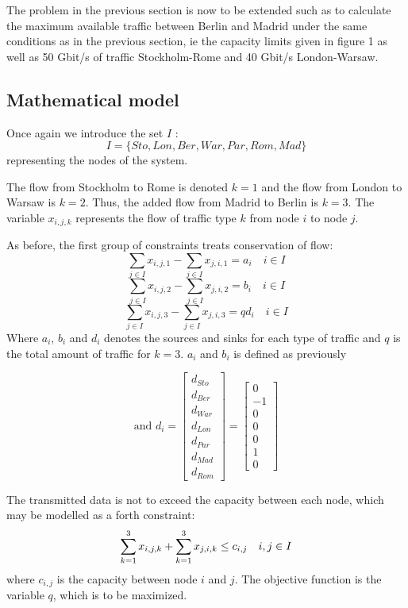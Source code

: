 The problem in the previous section is now to be extended such as to calculate the maximum  available traffic between Berlin and Madrid under the same conditions as in the previous section, ie the capacity limits given in figure 1 as well as 50 Gbit/s of traffic Stockholm-Rome and 40 Gbit/s London-Warsaw. 

\subsection{Mathematical model}
Once again we introduce the set $I$ :
$$I = \{ Sto,Lon,Ber,War,Par,Rom,Mad\}$$
representing the nodes of the system.

The flow from Stockholm to Rome is denoted $k=1$ and the flow from London to Warsaw is $k=2$. Thus, the added flow from Madrid to Berlin is $k=3$. The variable $x_{i,j,k}$ represents the flow of traffic type $k$ from node $i$ to node $j$.

As before, the first  group of constraints treats conservation of flow:
$$\sum\limits_{j \in I} x_{i,j,1} - \sum\limits_{j \in I} x_{j,i,1} = a_{i} \quad i \in I$$
$$\sum\limits_{j \in I} x_{i,j,2} - \sum\limits_{j \in I} x_{j,i,2} = b_{i} \quad i \in I$$
$$\sum\limits_{j \in I} x_{i,j,3} - \sum\limits_{j \in I} x_{j,i,3} = q d_{i} \quad i \in I$$
Where $a_i$, $b_i$ and $d_i$ denotes the sources and sinks for each type of traffic and $q$ is the total amount of traffic for $k=3$. $a_i$ and $b_i$ is defined as previously

$$
\text{and } d_{i} = 
 \begin{bmatrix}
  d_{Sto}\\
  d_{Ber}\\
  d_{War}\\
  d_{Lon}\\
  d_{Par}\\
  d_{Mad}\\
  d_{Rom}
 \end{bmatrix} =
 \begin{bmatrix}
  0\\
  -1\\
  0\\
  0\\
  0\\
  1\\
  0
 \end{bmatrix}
$$



The transmitted data is not to exceed the capacity between each node, which may be modelled as a forth constraint:
$$\sum\limits_{k =1}^3 x_{i,j,k} + \sum\limits_{k =1}^3 x_{j,i,k} \leq c_{i,j} \quad i,j \in I\\$$
where $c_{i,j}$ is the capacity between node $i$ and $j$. The objective function is the variable $q$, which is to be maximized.


